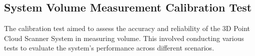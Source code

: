 \subsection{System Volume Measurement Calibration Test}
\label{ch3:subsection:volume-measurement-test}

The calibration test aimed to assess the accuracy and reliability of the 3D Point Cloud Scanner System in measuring volume. This involved conducting various tests to evaluate the system's performance across different scenarios.







